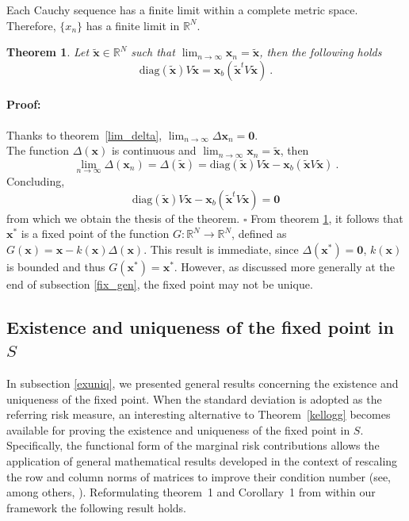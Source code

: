 \documentclass[preprint,11pt,authoryear]{elsarticle}
\newtheorem{theorem}{Theorem}%
\newenvironment{proof}{\paragraph{Proof:}}{\hfill$\square$}
\begin{document}
Each Cauchy sequence has a finite limit within a complete metric space. Therefore, $\{ x_n\}$ has a finite limit in $\mathbb R^N$.  

\begin{theorem}\label{lallo}
Let $\widetilde{\mathbf{x}} \in \mathbb R^N$ such that $\lim_{n\rightarrow \infty} \mathbf{x}_n=\widetilde{\mathbf{x}}$, then the following holds
 $$\textrm{diag} (\widetilde{\mathbf{x}})V\widetilde{\mathbf{x}}=\mathbf{x}_b (\widetilde{\mathbf{x}}^{t}V\widetilde{\mathbf{x}}) \ . $$
\end{theorem}
\begin{proof}
Thanks to theorem~\ref{lim_delta},  $\lim_{n\rightarrow \infty} \Delta \mathbf{x}_n =\mathbf{0}$. \\
The function $\Delta (\mathbf{x})$ is continuous and $\lim_{n\rightarrow \infty} \mathbf{x}_n=\widetilde{\mathbf{x}}$, then
 $$ \lim_{n\rightarrow \infty} \Delta (\mathbf{x}_n)= \Delta (\widetilde{\mathbf{x}}) =  \textrm{diag} (\widetilde{\mathbf{x}})V\widetilde{\mathbf{x}}-\mathbf{x}_b (\widetilde{\mathbf{x}}V\widetilde{\mathbf{x}})  \ .$$
Concluding,  
$$ \textrm{diag} (\widetilde{\mathbf{x}})V\widetilde{\mathbf{x}}-\mathbf{x}_b (\widetilde{\mathbf{x}}^{t}V\widetilde{\mathbf{x}})  = \textbf{0}$$
from which we obtain the thesis of the theorem.
\end{proof}
From theorem \ref{lallo}, it follows that $\mathbf{x}^*$ is a fixed point of the function $G: \mathbb R^N \rightarrow \mathbb R^N$, defined as $G(\mathbf{x})=\mathbf{x}- k(\mathbf{x}) \Delta (\mathbf{x})$. This result is immediate, since $\Delta (\mathbf{x}^*) = \mathbf{0}$, $k(\mathbf{x})$ is bounded and thus $G(\mathbf{x}^*)=\mathbf{x}^*$. However, as discussed more generally at the end of subsection \ref{fix_gen}, the fixed point may not be unique. 

\subsection{Existence and uniqueness of the fixed point in $S$}
In subsection \ref{exuniq}, we presented general results concerning the existence and uniqueness of the fixed point. When the standard deviation is adopted as the referring risk measure, an interesting alternative to Theorem~\ref{kellogg} becomes available for proving the existence and uniqueness of the fixed point in $S$. Specifically, the functional form of the marginal risk contributions allows the application of general mathematical results developed in the context of rescaling the row and column norms of matrices to improve their condition number (see, among others, \cite{o2003scaling}). Reformulating theorem~1 and Corollary~1 from \cite{o2003scaling} within our framework the following result holds.
\end{document}
